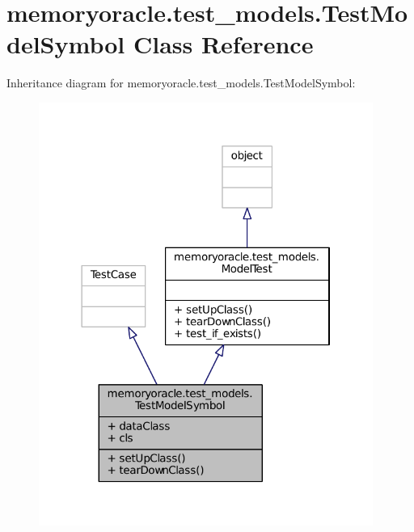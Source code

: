 \hypertarget{classmemoryoracle_1_1test__models_1_1TestModelSymbol}{}\section{memoryoracle.\+test\+\_\+models.\+Test\+Model\+Symbol Class Reference}
\label{classmemoryoracle_1_1test__models_1_1TestModelSymbol}


Inheritance diagram for memoryoracle.\+test\+\_\+models.\+Test\+Model\+Symbol\+:\nopagebreak
\begin{figure}[H]
\begin{center}
\leavevmode
\includegraphics[width=310pt]{classmemoryoracle_1_1test__models_1_1TestModelSymbol__inherit__graph}
\end{center}
\end{figure}



